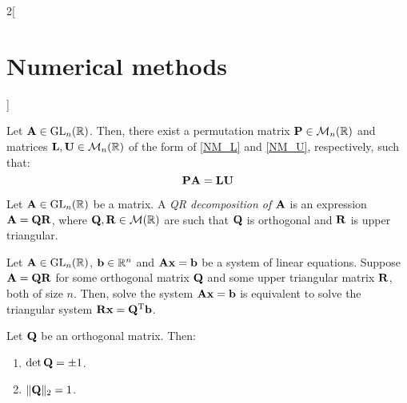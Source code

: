 \documentclass[../../../main.tex]{subfiles}
\begin{document}
\begin{multicols}{2}[\section{Numerical methods}]
\begin{definition}
  \end{definition}
  \begin{prop}
    Let $\boldsymbol{\mathrm{A}}\in\mathrm{GL}_n(\mathbb{R})$. Then, there exist a permutation matrix $\boldsymbol{\mathrm{P}}\in\mathcal{M}_n(\mathbb{R})$ and matrices $\boldsymbol{\mathrm{L}},\boldsymbol{\mathrm{U}}\in\mathcal{M}_n(\mathbb{R})$ of the form of \eqref{NM_L} and \eqref{NM_U}, respectively, such that: $$\boldsymbol{\mathrm{P}}\boldsymbol{\mathrm{A}}=\boldsymbol{\mathrm{L}}\boldsymbol{\mathrm{U}}$$
  \end{prop}
  \begin{definition}[QR descompostion]
    Let $\boldsymbol{\mathrm{A}}\in\mathrm{GL}_n(\mathbb{R})$ be a matrix. A \textit{QR decomposition of $\boldsymbol{\mathrm{A}}$} is an expression $\boldsymbol{\mathrm{A}}=\boldsymbol{\mathrm{Q}}\boldsymbol{\mathrm{R}}$, where $\boldsymbol{\mathrm{Q}},\boldsymbol{\mathrm{R}}\in\mathcal{M}(\mathbb{R})$ are such that $\boldsymbol{\mathrm{Q}}$ is orthogonal and $\boldsymbol{\mathrm{R}}$ is upper triangular.
  \end{definition}
  \begin{lemma}
    Let $\boldsymbol{\mathrm{A}}\in\mathrm{GL}_n(\mathbb{R})$, $\boldsymbol{\mathrm{b}}\in\mathbb{R}^n$ and $\boldsymbol{\mathrm{A}}\boldsymbol{\mathrm{x}}=\boldsymbol{\mathrm{b}}$ be a system of linear equations. Suppose $\boldsymbol{\mathrm{A}}=\boldsymbol{\mathrm{Q}}\boldsymbol{\mathrm{R}}$ for some orthogonal matrix $\boldsymbol{\mathrm{Q}}$ and some upper triangular matrix $\boldsymbol{\mathrm{R}}$, both of size $n$. Then, solve the system $\boldsymbol{\mathrm{A}}\boldsymbol{\mathrm{x}}=\boldsymbol{\mathrm{b}}$ is equivalent to solve the triangular system $\boldsymbol{\mathrm{R}}\boldsymbol{\mathrm{x}}=\vb{Q}^{\mathrm{T}}\boldsymbol{\mathrm{b}}$.
  \end{lemma}
  \begin{lemma}
    Let $\boldsymbol{\mathrm{Q}}$ be an orthogonal matrix. Then:
    \begin{enumerate}
      \item $\det\boldsymbol{\mathrm{Q}}=\pm 1$.
      \item $\|\boldsymbol{\mathrm{Q}}\|_2=1$.
    \end{enumerate}
  \end{lemma}
\end{multicols}
\end{document}
